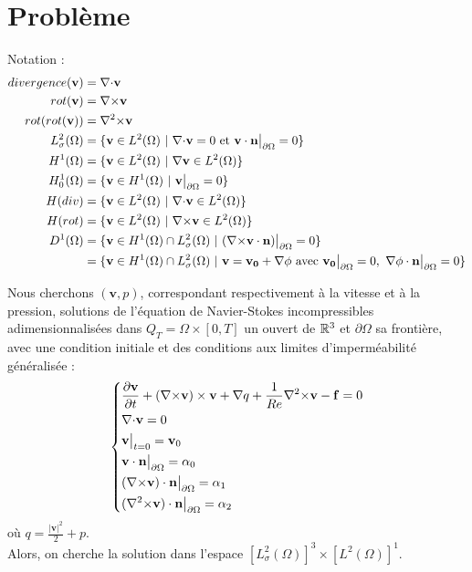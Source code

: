 \chapter{Problème}

Notation :
\begin{align*}
divergence(\mathbf{v})&=\div \mathbf{v}\\
rot(\mathbf{v})&=\rot \mathbf{v}\\
rot(rot(\mathbf{v}))&=\rott \mathbf{v}\\
L^2_\sigma(\Omega) &= \{\mathbf{v} \in L^2(\Omega)\ |\ \div \mathbf{v} = 0\text{ et }\mathbf{v}\cdot \mathbf{n}\restr = 0 \}\\
H^1(\Omega) &= \{\mathbf{v} \in L^2(\Omega)\ |\ \grad \mathbf{v}\in L^2(\Omega)\}\\
H^1_0(\Omega) &= \{\mathbf{v} \in H^1(\Omega)\ |\ \mathbf{v}\restr = 0\}\\
H(div) &= \{\mathbf{v} \in L^2(\Omega)\ |\ \div\mathbf{v} \in L^2(\Omega) \}\\
H(rot) &= \{\mathbf{v} \in L^2(\Omega)\ |\ \rot\mathbf{v} \in L^2(\Omega) \}\\
D^1(\Omega) &= \{\mathbf{v} \in H^1(\Omega)\cap L^2_\sigma(\Omega)\ |\ (\rot \mathbf{v}\cdot \mathbf{n})\restr = 0  \}\\
&=\{\mathbf{v} \in H^1(\Omega)\cap L^2_\sigma(\Omega)\ |\ \mathbf{v}=\mathbf{v_0}+\grad\phi \text{ avec } \mathbf{v_0}\restr = 0,\ \grad\phi\cdot \mathbf{n}\restr = 0 \}
\end{align*}

Nous cherchons $(\mathbf{v},p)$, correspondant respectivement à la vitesse et à la pression, solutions de l'équation de Navier-Stokes incompressibles adimensionnalisées dans $Q_T=\Omega\times[0,T]$ un ouvert de ${\mathbb{R}}^3$ et $\partial\Omega$ sa frontière, avec une condition initiale et des conditions aux limites d'imperméabilité généralisée :
\begin{equation}
\label{depart}
\left\{
\begin{aligned}
&\frac{\partial \mathbf{v}}{\partial t} + ({\nabla\times}  \mathbf{v})\times \mathbf{v} + {\nabla} q + \frac{1}{Re}{\nabla^2\times}  \mathbf{v}-\mathbf{f} = 0\\
&{\nabla\cdot} \mathbf{v} = 0\\
&\mathbf{v}\big\rvert_{t=0} = \mathbf{v}_0\\
&\mathbf{v}\cdot \mathbf{n}{\big\rvert_{\partial\Omega}} = \alpha_0\\
&({\nabla\times}  \mathbf{v})\cdot \mathbf{n}{\big\rvert_{\partial\Omega}} = \alpha_1\\
&({\nabla^2\times}  \mathbf{v})\cdot \mathbf{n}{\big\rvert_{\partial\Omega}} = \alpha_2
\end{aligned}
\right.
\end{equation}
où $q = \frac{|\mathbf{v}|^2}{2}+p$.\\
Alors, on cherche la solution dans l'espace $[L^2_\sigma(\Omega)]^3\times [L^2(\Omega)]^1$.\\


